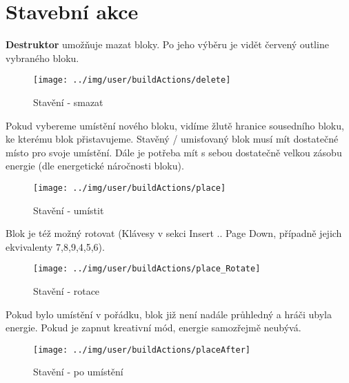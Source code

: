 
\section{Stavební akce}

\textbf{Destruktor} umožňuje mazat bloky. Po jeho výběru je vidět červený outline vybraného bloku.

\begin{figure}[!h]\centering
\texttt{[image: ../img/user/buildActions/delete]}

\caption{Stavění - smazat}
\label{fig:user_buildActions_delete}

\end{figure}

\FloatBarrier

Pokud vybereme umístění nového bloku, vidíme žlutě hranice sousedního bloku, ke kterému blok přistavujeme. Stavěný / umisťovaný blok musí mít dostatečné místo pro svoje umístění. Dále je potřeba mít s sebou dostatečně velkou zásobu energie (dle energetické náročnosti bloku).

\begin{figure}[!h]\centering
\texttt{[image: ../img/user/buildActions/place]}

\caption{Stavění - umístit}
\label{fig:user_buildActions_place}

\end{figure}

\FloatBarrier

Blok je též možný rotovat (Klávesy v sekci Insert .. Page Down, případně jejich ekvivalenty 7,8,9,4,5,6).

\begin{figure}[!h]\centering
\texttt{[image: ../img/user/buildActions/place\_Rotate]}

\caption{Stavění - rotace}
\label{fig:user_buildActions_place_Rotate}

\end{figure}

\FloatBarrier

Pokud bylo umístění v pořádku, blok již není nadále průhledný a hráči ubyla energie. Pokud je zapnut kreativní mód, energie samozřejmě neubývá.

\begin{figure}[!h]\centering
\texttt{[image: ../img/user/buildActions/placeAfter]}

\caption{Stavění - po umístění}
\label{fig:user_buildActions_placeAfter}

\end{figure}


\FloatBarrier